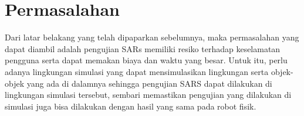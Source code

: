 \section{Permasalahan}
\label{sec:permasalahan}

Dari latar belakang yang telah dipaparkan sebelumnya,
  maka permasalahan yang dapat diambil adalah pengujian SARs memiliki resiko terhadap keselamatan pengguna serta dapat memakan biaya dan waktu yang besar.
Untuk itu, perlu adanya lingkungan simulasi yang dapat mensimulasikan lingkungan serta objek-objek yang ada di dalamnya sehingga pengujian SARS dapat dilakukan di lingkungan simulasi tersebut,
  sembari memastikan pengujian yang dilakukan di simulasi juga bisa dilakukan dengan hasil yang sama pada robot fisik.
